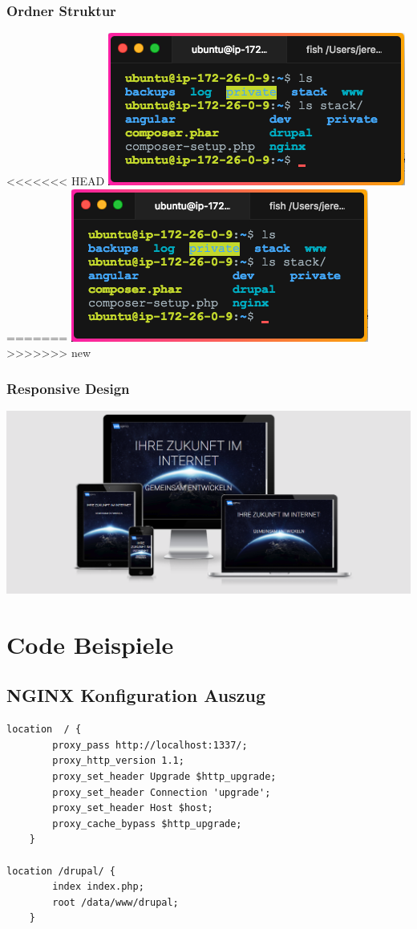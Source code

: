 \documentclass[11pt,a4paper]{article}
\begin{document}
\begin{appendices}
\subsubsection{Ordner Struktur}
\label{sec:ordner}
<<<<<<< HEAD
\includegraphics[scale=0.8]{Terminal}
=======
\includegraphics[scale=0.8]{terminal}
>>>>>>> new
\subsubsection{Responsive Design}
\label{sec:responsive}
\includegraphics[scale=0.3]{responsive}
\section{Code Beispiele}
\subsection{NGINX Konfiguration Auszug}
\label{sec:nginx}
\begin{lstlisting}[frame=single,   basicstyle=\footnotesize]
location  / {
        proxy_pass http://localhost:1337/;
        proxy_http_version 1.1;
        proxy_set_header Upgrade $http_upgrade;
        proxy_set_header Connection 'upgrade';
        proxy_set_header Host $host;
        proxy_cache_bypass $http_upgrade;
    }

location /drupal/ {
        index index.php;
        root /data/www/drupal;
    }
\end{lstlisting}
\end{appendices}
\end{document}
